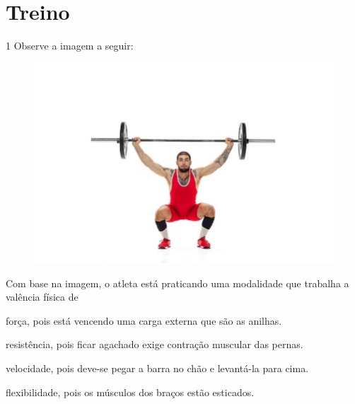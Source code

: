 

\section*{Treino}

\num{1} Observe a imagem a seguir:

\begin{figure}[htpb!]
\centering
\includegraphics[width=.5\textwidth]{./imgs/img2.jpg}
\end{figure}

Com base na imagem, o atleta está praticando uma modalidade que trabalha
a valência física de

\begin{escolha}
\item força, pois está vencendo uma carga externa que são as anilhas.

\item resistência, pois ficar agachado exige contração muscular das pernas.

\item velocidade, pois deve-se pegar a barra no chão e levantá-la para
cima.

\item flexibilidade, pois os músculos dos braços estão esticados.
\end{escolha}


